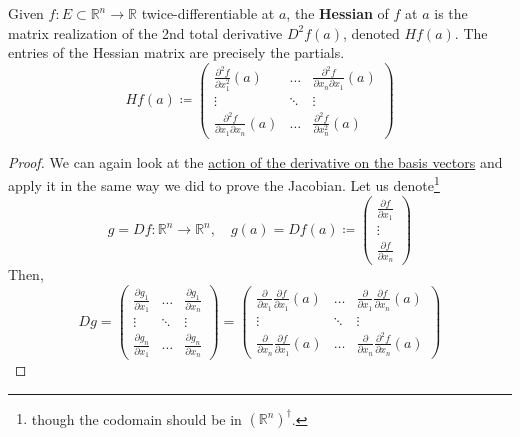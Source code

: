   \begin{definition}[Hessian]
    \label{def:hessian}
    Given $f: E \subset \mathbb{R}^n \to \mathbb{R}$ twice-differentiable at $a$, the \textbf{Hessian} of $f$ at $a$ is the matrix realization of the 2nd total derivative $D^2 f(a)$, denoted $Hf(a)$. The entries of the Hessian matrix are precisely the partials. 
    \begin{equation}
      H f(a) \coloneqq \begin{pmatrix} 
				\frac{\partial^2 f}{\partial x_1^2} (a) & \ldots & \frac{\partial^2 f}{\partial x_n \partial x_1} (a) \\
        \vdots & \ddots & \vdots \\
				\frac{\partial^2 f}{\partial x_1 \partial x_n} (a) & \ldots & \frac{\partial^2 f}{\partial x_n^2} (a)
			\end{pmatrix} 
    \end{equation}
  \end{definition}
  \begin{proof}
		We can again look at the \hyperref[thm:action-of-derivative-on-basis-vectors]{action of the derivative on the basis vectors} and apply it in the same way we did to prove the Jacobian. Let us denote\footnote{though the codomain should be in $(\mathbb{R}^n)^\dagger$.} 
		\begin{equation}
			g = Df : \mathbb{R}^n \to \mathbb{R}^n, \quad g(a) = Df(a) \coloneqq \begin{pmatrix} \frac{\partial f}{\partial x_1} \\ \vdots \\ \frac{\partial f}{\partial x_n} \end{pmatrix} 
		\end{equation}
		Then, 
		\begin{equation}
			Dg = \begin{pmatrix} 
				\frac{\partial g_1}{\partial x_1} & \ldots & \frac{\partial g_1}{\partial x_n} \\ 
				\vdots & \ddots & \vdots \\ 
				\frac{\partial g_n}{\partial x_1} & \ldots & \frac{\partial g_n}{\partial x_n} 
			\end{pmatrix} = \begin{pmatrix} 
				\frac{\partial}{\partial x_1} \frac{\partial f}{\partial x_1} (a) & \ldots & \frac{\partial}{\partial x_1} \frac{\partial f}{\partial x_n} (a) \\
        \vdots & \ddots & \vdots \\
				\frac{\partial}{\partial x_n} \frac{\partial f}{\partial x_1} (a) & \ldots & \frac{\partial}{\partial x_n} \frac{\partial^2 f}{\partial x_n} (a)
			\end{pmatrix} 
		\end{equation}
  \end{proof}

